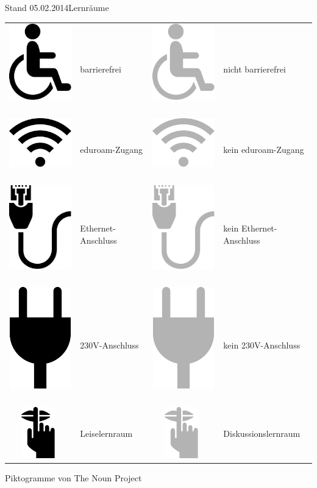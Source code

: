 \documentclass[10pt]{article}
\begin{document}
\begin{rueckseite}{Stand 05.02.2014}{Lernr\"aume}
{{{\scriptsize\begin{tabu}{c|lc|l}
\includegraphics[height=1.5ex]{access}~   & barrierefrei        & \includegraphics[height=1.5ex]{noaccess}~   & nicht barrierefrei\\
\includegraphics[height=1.5ex]{wifi}~     & eduroam-Zugang      & \includegraphics[height=1.5ex]{nowifi}~     & kein eduroam-Zugang\\
\includegraphics[height=1.5ex]{ethernet}~ & Ethernet-Anschluss  & \includegraphics[height=1.5ex]{noethernet}~ & kein Ethernet-Anschluss\\
\includegraphics[height=1.5ex]{power}~    & 230V-Anschluss       & \includegraphics[height=1.5ex]{nopower}~    & kein 230V-Anschluss\\
\includegraphics[height=1.5ex]{silent}~   & Leiselernraum       & \includegraphics[height=1.5ex]{nosilent}~   & Diskussionslernraum
\end{tabu}

\vspace{1.50ex}
Piktogramme von The Noun Project}

}}
\end{rueckseite}
\end{document}
